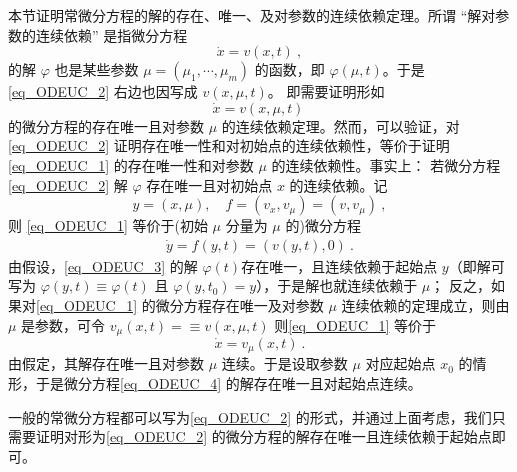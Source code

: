 
本节证明常微分方程的解的存在、唯一、及对参数的连续依赖定理。所谓 “解对参数的连续依赖” 是指微分方程
\begin{equation}\label{eq_ODEUC_2}
\dot x=v(x,t)~,
\end{equation}
 的解 $\varphi$ 也是某些参数 $\mu=(\mu_1,\cdots,\mu_m)$ 的函数，即 $\varphi(\mu,t)$。于是 \autoref{eq_ODEUC_2} 右边也因写成 $v(x,\mu,t)$。 即需要证明形如
\begin{equation}\label{eq_ODEUC_1}
\dot x=v(x,\mu,t)~
\end{equation}
的微分方程的存在唯一且对参数 $\mu$ 的连续依赖定理。然而，可以验证，对\autoref{eq_ODEUC_2} 证明存在唯一性和对初始点的连续依赖性，等价于证明\autoref{eq_ODEUC_1} 的存在唯一性和对参数 $\mu$ 的连续依赖性。事实上：
若微分方程\autoref{eq_ODEUC_2} 解 $\varphi$ 存在唯一且对初始点 $x$ 的连续依赖。记 
\begin{equation}
y=(x,\mu),\quad f=(v_x,v_{\mu})=(v,v_{\mu})~,
\end{equation}
则 \autoref{eq_ODEUC_1} 等价于(初始 $\mu$ 分量为 $\mu$ 的)微分方程
\begin{equation}\label{eq_ODEUC_3}
\begin{aligned}
\dot y=f(y,t)=(v(y,t),0)~.
\end{aligned}
\end{equation}
由假设，\autoref{eq_ODEUC_3} 的解 $\varphi(t)$存在唯一，且连续依赖于起始点 $y$（即解可写为 $\varphi(y,t)\equiv\varphi(t)$ 且 $\varphi(y,t_0)=y$），于是解也就连续依赖于 $\mu$；
反之，如果对\autoref{eq_ODEUC_1} 的微分方程存在唯一及对参数 $\mu$ 连续依赖的定理成立，则由 $\mu$ 是参数，可令 $v_\mu(x,t)=\equiv v(x,\mu,t)$ 则\autoref{eq_ODEUC_1} 等价于
\begin{equation}\label{eq_ODEUC_4} 
\dot x=v_{\mu}(x,t)~.
\end{equation}
由假定，其解存在唯一且对参数 $\mu$ 连续。于是设取参数 $\mu$ 对应起始点 $x_0$ 的情形，于是微分方程\autoref{eq_ODEUC_4} 的解存在唯一且对起始点连续。

一般的常微分方程都可以写为\autoref{eq_ODEUC_2} 的形式，并通过上面考虑，我们只需要证明对形为\autoref{eq_ODEUC_2} 的微分方程的解存在唯一且连续依赖于起始点即可。

